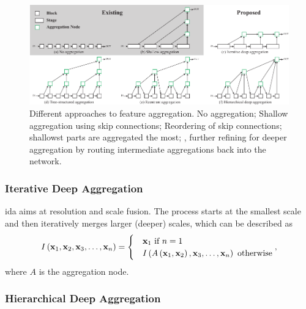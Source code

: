 \begin{figure}[t]
    \centerline{\includegraphics[width=\linewidth]{figures/theoretical_foundations/dla_existing_vs_proposed.pdf}}
    \caption[\Gls{dla} proposed solution]{Different approaches to feature aggregation.  No aggregation;  Shallow aggregation using skip connections;  Reordering of skip connections;  shallowst parts are aggregated the most; ,  further refining for deeper aggregation by routing intermediate aggregations back into the network. }
    \label{fig:DLADiffApproaches}
\end{figure}

\subsubsection{Iterative Deep Aggregation}

\gls{ida} aims at resolution and scale fusion. The process starts at the smallest scale and then iteratively merges larger (deeper) scales, which can be described as
\begin{equation}
    \label{eq:IterativeDeepAggregation}
    {I} \left( \mathbf{x}_1, \mathbf{x}_2, \mathbf{x}_3, \dots, \mathbf{x}_n \right) =
    \begin{cases}
         & \mathbf{x}_1 \text{ if } n = 1                                                                \\
         & {I} \left( {A} \left( \mathbf{x}_1, \mathbf{x}_2 \right), \mathbf{x}_3, \dots, \mathbf{x}_n \right) \text{ otherwise}
    \end{cases},
\end{equation}
where $A$ is the aggregation node.

\subsubsection{Hierarchical Deep Aggregation}

